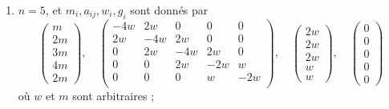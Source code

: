 \begin{lemma}[Genre un]
\begin{enumerate}
$$\begin{matrix}
-2w & w & 0 & 0 & 0 \\
w & -2w & w & 0 & 0 \\
0 & w & -2w & 2w & 0 \\
0 & 0 & 2w & -4w & 2w \\
0 & 0 & 0 & 2w & -4w \\
\end{matrix}
\right),
\quad
\left(
\begin{matrix}
w \\
w \\
w \\
2w \\
2w
\end{matrix}
\right),
\quad
\left(
\begin{matrix}
0 \\
0 \\
0 \\
0 \\
0
\end{matrix}
\right)
$$
où $w$ et $m$ sont arbitraires ;
\item
\label{item-equal-equal-down-equal}
$n = 5$, et $m_i, a_{ij}, w_i, g_i$ sont donnés par
$$
\left(
\begin{matrix}
m \\
2m \\
3m \\
4m \\
2m
\end{matrix}
\right),
\quad
\left(
\begin{matrix}
-4w & 2w & 0 & 0 & 0 \\
2w & -4w & 2w & 0 & 0 \\
0 & 2w & -4w & 2w & 0 \\
0 & 0 & 2w & -2w & w \\
0 & 0 & 0 & w & -2w \\
\end{matrix}
\right),
\quad
\left(
\begin{matrix}
2w \\
2w \\
2w \\
w \\
w
\end{matrix}
\right),
\quad
\left(
\begin{matrix}
0 \\
0 \\
0 \\
0 \\
0
\end{matrix}
\right)
$$
où $w$ et $m$ sont arbitraires ;

\end{enumerate}
\end{lemma}
